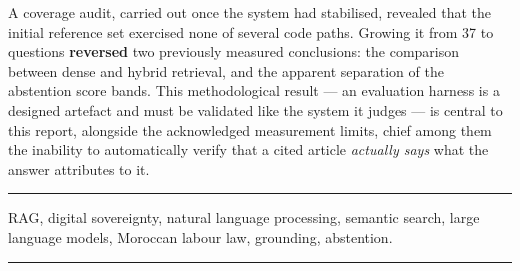 A coverage audit, carried out once the system had stabilised, revealed that the initial reference
set exercised none of several code paths. Growing it from 37 to \NbQuestions{} questions
\textbf{reversed} two previously measured conclusions: the comparison between dense and hybrid
retrieval, and the apparent separation of the abstention score bands. This methodological result
--- an evaluation harness is a designed artefact and must be validated like the system it judges
--- is central to this report, alongside the acknowledged measurement limits, chief among them the
inability to automatically verify that a cited article \emph{actually says} what the answer
attributes to it.

\vspace{0.6cm}
{\color{rule}\rule{\textwidth}{0.8pt}}

\vspace{2pt}
RAG, digital sovereignty, natural language processing, semantic search, large language models,
Moroccan labour law, grounding, abstention.

\vspace{2pt}
{\color{rule}\rule{\textwidth}{0.8pt}}

